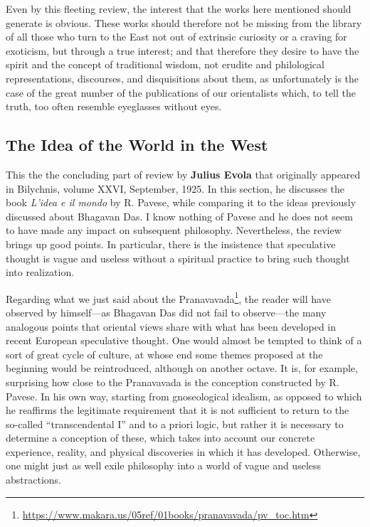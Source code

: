Even by this fleeting review, the interest that the works here mentioned should generate is obvious. These works should therefore not be missing from the library of all those who turn to the East not out of extrinsic curiosity or a craving for exoticism, but through a true interest; and that therefore they desire to have the spirit and the concept of traditional wisdom, not erudite and philological representations, discourses, and disquisitions about them, as unfortunately is the case of the great number of the publications of our orientalists which, to tell the truth, too often resemble eyeglasses without eyes.

\subsection*{The Idea of the World in the West}
\begin{quotex}
This the the concluding part of review by \textbf{Julius Evola} that originally appeared in Bilychnis, volume XXVI, September, 1925. In this section, he discusses the book \textit{L'idea e il mondo} by R. Pavese, while comparing it to the ideas previously discussed about Bhagavan Das. I know nothing of Pavese and he does not seem to have made any impact on subsequent philosophy. Nevertheless, the review brings up good points. In particular, there is the insistence that speculative thought is vague and useless without a spiritual practice to bring such thought into realization.
\end{quotex}

Regarding what we just said about the Pranavavada\footnote{\url{https://www.makara.us/05ref/01books/pranavavada/pv_toc.htm}}, the reader will have observed by himself---as Bhagavan Das did not fail to observe---the many analogous points that oriental views share with what has been developed in recent European speculative thought. One would almost be tempted to think of a sort of great cycle of culture, at whose end some themes proposed at the beginning would be reintroduced, although on another octave. It is, for example, surprising how close to the Pranavavada is the conception constructed by R. Pavese. In his own way, starting from gnoseological idealism, as opposed to which he reaffirms the legitimate requirement that it is not sufficient to return to the so-called ``transcendental I'' and to a priori logic, but rather it is necessary to determine a conception of these, which takes into account our concrete experience, reality, and physical discoveries in which it has developed. Otherwise, one might just as well exile philosophy into a world of vague and useless abstractions.

